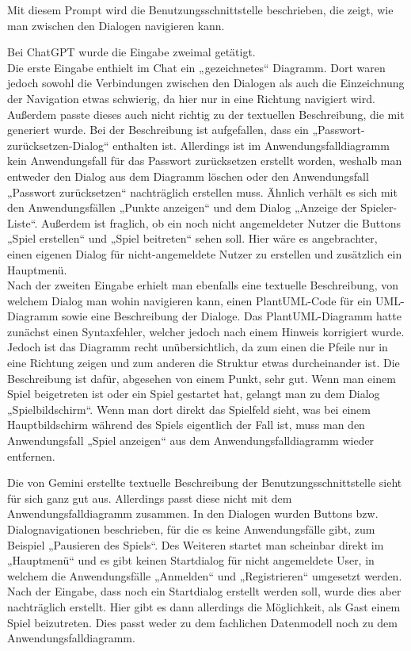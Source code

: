Mit diesem Prompt wird die Benutzungsschnittstelle beschrieben, die zeigt, wie man zwischen den Dialogen navigieren kann.

Bei ChatGPT wurde die Eingabe zweimal getätigt.\\
Die erste Eingabe enthielt im Chat ein „gezeichnetes“ Diagramm. Dort waren jedoch sowohl die Verbindungen zwischen den 
Dialogen als auch die Einzeichnung der Navigation etwas schwierig, da hier nur in eine Richtung navigiert wird. Außerdem 
passte dieses auch nicht richtig zu der textuellen Beschreibung, die mit generiert wurde. Bei der Beschreibung ist aufgefallen, 
dass ein „Passwort-zurücksetzen-Dialog“ enthalten ist. Allerdings ist im Anwendungsfalldiagramm kein Anwendungsfall für das 
Passwort zurücksetzen erstellt worden, weshalb man entweder den Dialog aus dem Diagramm löschen oder den Anwendungsfall 
„Passwort zurücksetzen“ nachträglich erstellen muss. Ähnlich verhält es sich mit den Anwendungsfällen „Punkte anzeigen“ und dem 
Dialog „Anzeige der Spieler-Liste“. Außerdem ist fraglich, ob ein noch nicht angemeldeter Nutzer die Buttons „Spiel erstellen“ 
und „Spiel beitreten“ sehen soll. Hier wäre es angebrachter, einen eigenen Dialog für nicht-angemeldete Nutzer zu erstellen und 
zusätzlich ein Hauptmenü.\\
Nach der zweiten Eingabe erhielt man ebenfalls eine textuelle Beschreibung, von welchem Dialog man wohin navigieren kann, einen 
PlantUML-Code für ein UML-Diagramm sowie eine Beschreibung der Dialoge. Das PlantUML-Diagramm hatte zunächst einen Syntaxfehler, 
welcher jedoch nach einem Hinweis korrigiert wurde. Jedoch ist das Diagramm recht unübersichtlich, da zum einen die Pfeile nur in 
eine Richtung zeigen und zum anderen die Struktur etwas durcheinander ist. Die Beschreibung ist dafür, abgesehen von einem Punkt, 
sehr gut. Wenn man einem Spiel beigetreten ist oder ein Spiel gestartet hat, gelangt man zu dem Dialog „Spielbildschirm“. Wenn man 
dort direkt das Spielfeld sieht, was bei einem Hauptbildschirm während des Spiels eigentlich der Fall ist, muss man den Anwendungsfall 
„Spiel anzeigen“ aus dem Anwendungsfalldiagramm wieder entfernen.

Die von Gemini erstellte textuelle Beschreibung der Benutzungsschnittstelle sieht für sich ganz gut aus. Allerdings passt diese nicht 
mit dem Anwendungsfalldiagramm zusammen. In den Dialogen wurden Buttons bzw. Dialognavigationen beschrieben, für die es keine 
Anwendungsfälle gibt, zum Beispiel „Pausieren des Spiels“. Des Weiteren startet man scheinbar direkt im „Hauptmenü“ und es gibt keinen 
Startdialog für nicht angemeldete User, in welchem die Anwendungsfälle „Anmelden“ und „Registrieren“ umgesetzt werden. Nach der Eingabe, 
dass noch ein Startdialog erstellt werden soll, wurde dies aber nachträglich erstellt. Hier gibt es dann allerdings die Möglichkeit, 
als Gast einem Spiel beizutreten. Dies passt weder zu dem fachlichen Datenmodell noch zu dem Anwendungsfalldiagramm.

